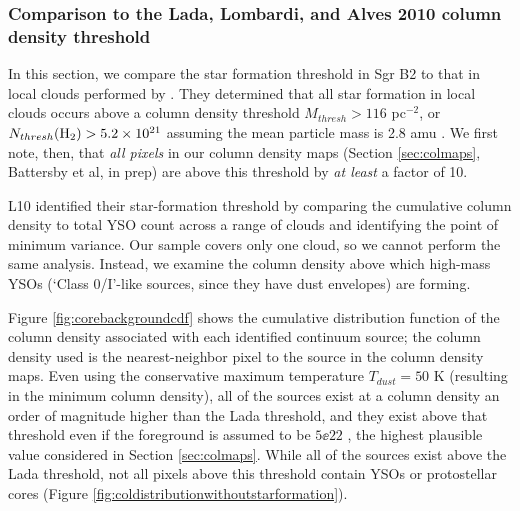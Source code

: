 \documentclass[twocolumn]{aastex61}
\begin{document}
\subsubsection{Comparison to the Lada, Lombardi, and Alves 2010 column density threshold}
\label{sec:ladathreshold}
In this section, we compare the star formation threshold in Sgr B2 to that in
local clouds performed by \citet[][hereafter, L10]{Lada2010a}.  They determined
that all star
formation in local clouds occurs above a column density threshold $M_{thresh} >
116$ \msun pc$^{-2}$, or $N_{thresh}(\textrm{H}_{2}) > 5.2\times10^{21}$ \persc assuming the
mean particle mass is 2.8 amu \citep{Kauffmann2008a}.  We first note, then,
that \emph{all pixels} in our column density maps (Section \ref{sec:colmaps},
Battersby et al, in prep) are above this threshold by \emph{at least} a factor
of 10.

L10 identified their star-formation threshold by comparing the
cumulative column density to total YSO count across a range of clouds and
identifying the point of minimum variance.  Our sample covers only one cloud,
so we cannot perform the same analysis.  Instead, we examine the column density
above which high-mass YSOs (`Class 0/I'-like sources, since they have dust
envelopes) are forming.

Figure \ref{fig:corebackgroundcdf} shows the cumulative distribution function
of the column density associated with each identified continuum source; the
column density used is the nearest-neighbor pixel to the source in the column
density maps.  Even using the conservative maximum temperature $T_{dust}=50$ K
(resulting in the minimum column density), all of the sources exist at a column
density an order of magnitude higher than the Lada threshold, and they exist
above that threshold even if the foreground is assumed to be $5\ee{22}$ \persc,
the highest plausible value considered in Section \ref{sec:colmaps}.
While all of the sources exist above the Lada threshold, not all pixels above
this threshold contain YSOs or protostellar cores (Figure
\ref{fig:coldistributionwithoutstarformation}).
\end{document}
